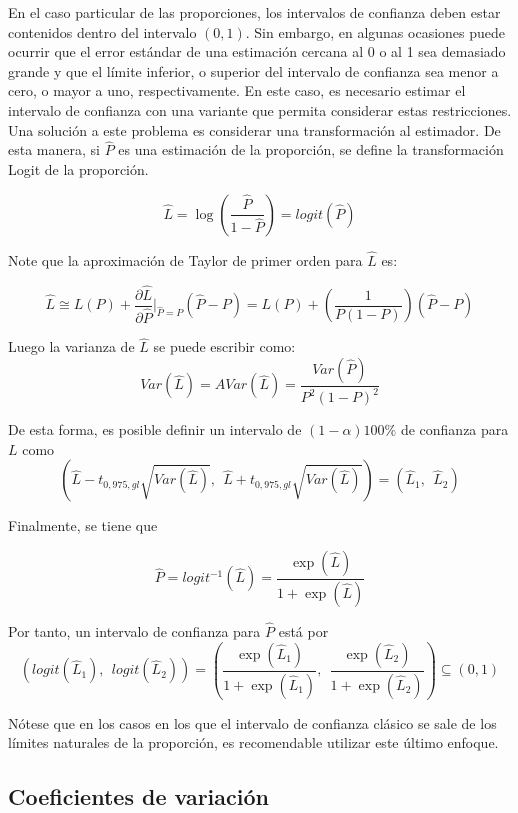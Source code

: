 \documentclass[
  12pt,
  spanish,
]{book}
\begin{document}
En el caso particular de las proporciones, los intervalos de confianza deben estar contenidos dentro del intervalo \((0, 1)\). Sin embargo, en algunas ocasiones puede ocurrir que el error estándar de una estimación cercana al 0 o al 1 sea demasiado grande y que el límite inferior, o superior del intervalo de confianza sea menor a cero, o mayor a uno, respectivamente. En este caso, es necesario estimar el intervalo de confianza con una variante que permita considerar estas restricciones. Una solución a este problema es considerar una transformación al estimador. De esta manera, si \(\hat{P}\) es una estimación de la proporción, se define la transformación Logit de la proporción.

\[
\hat{L} = \log \left(\dfrac{\hat{P}}{1-\hat{P}} \right) = logit(\hat{P})
\]

Note que la aproximación de Taylor de primer orden para \(\hat{L}\) es:

\[
\hat{L} \cong L(P) + \frac{\partial \hat{L}}{\partial \hat{P}}\biggr\rvert_{\hat{P}=P}(\hat{P}-P) = L(P) + \left( \dfrac{1}{P(1-P)}\right)(\hat{P}-P)
\]

Luego la varianza de \(\hat{L}\) se puede escribir como:
\[
Var(\hat{L}) = AVar(\hat{L}) = \dfrac{Var(\hat{P})}{P^2(1-P)^2}
\]

De esta forma, es posible definir un intervalo de \((1-\alpha)100\%\) de confianza para \(L\) como
\[
\left(\hat{L} - t_{0,975, gl}\sqrt{Var(\hat{L})}, \ \
\hat{L} + t_{0,975, gl}\sqrt{Var(\hat{L})}
\right) =
(\hat{L}_1, \ \ \hat{L}_2)
\]

Finalmente, se tiene que

\[
\hat{P} = logit^{-1}(\hat L) = \dfrac{\exp (\hat{L})}{1+\exp (\hat{L})}
\]

Por tanto, un intervalo de confianza para \(\hat{P}\) está por
\[
\left(logit(\hat{L}_1), \ \ logit(\hat{L}_2)\right) = 
\left(
\dfrac{\exp (\hat{L}_1)}{1+\exp (\hat{L}_1)}, \ \
\dfrac{\exp (\hat{L}_2)}{1+\exp (\hat{L}_2)}
\right) \subseteq (0, 1)
\]

Nótese que en los casos en los que el intervalo de confianza clásico se sale de los límites naturales de la proporción, es recomendable utilizar este último enfoque.

\hypertarget{coeficientes-de-variaciuxf3n}{%
\subsection{Coeficientes de variación}\label{coeficientes-de-variaciuxf3n}}
\end{document}
